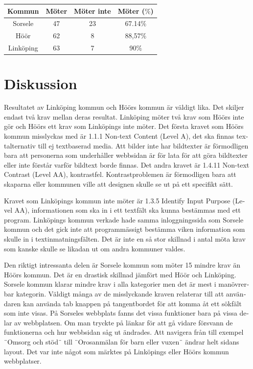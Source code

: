 \documentclass[11p]{article}
\begin{document}
\begin{otherlanguage}{swedish}
\begin{center}
    \begin{tabular}{ |c|c|c|c|}
        \hline
        Kommun & Möter & Möter inte & Möter ($\%$) \\  \hline
        Sorsele & 47 & 23 & 67.14$\%$ \\ \hline
        Höör & 62 & 8 & 88,57$\%$ \\ \hline
        Linköping & 63 & 7 & 90$\%$ \\ \hline
    \end{tabular}
    \end{center}

    \section{Diskussion} %
    Resultatet av Linköping kommun och Höörs kommun är väldigt lika.
    Det skiljer endast två krav mellan deras resultat.
    Linköping möter två krav som Höörs inte gör och Höörs ett krav som Linköpings inte möter.
    Det första kravet som  Höörs kommun misslyckas med är 1.1.1 Non-text Content (Level A), det ska finnas textalternativ till ej textbaserad media.
    Att bilder inte har bildtexter är förmodligen bara att personerna som underhåller webbsidan är för lata för att göra bildtexter eller inte förstår varför bildtext borde finnas.
    Det andra kravet är 1.4.11 Non-text Contrast (Level AA), kontrastfel.
    Kontrastproblemen är förmodligen bara att skaparna eller kommunen ville att designen skulle se ut på ett specifikt sätt.

    Kravet som Linköpings kommun inte möter är 1.3.5 Identify Input Purpose (Level AA), informationen som ska in i ett textfält ska kunna bestämmas med ett program.
    Linköpings kommun verkade hade samma inloggningssida som Sorsele kommun och det gick inte att programmässigt bestämma viken information som skulle in i textinmatningsfälten.
    Det är inte en så stor skillnad i antal möta krav som kanske skulle se likadan ut om andra kommuner valdes.

    Den riktigt intressanta delen är Sorsele kommun som möter 15 mindre krav än Höörs kommun.
    Det är en drastisk skillnad jämfört med Höör och Linköping.
    Sorsele kommun klarar mindre krav i alla kategorier men det är mest i manövrerbar kategorin.
    Väldigt många av de misslyckande kraven relaterar till att användaren kan använda tab knappen på tangentbordet för att komma åt ett sökfält som inte visas.
    På Sorseles webbplats fanns det vissa funktioner bara på vissa delar av webbplatsen.
    Om man tryckte på länkar för att gå vidare försvann de funktionerna och hur webbsidan såg ut ändrades.
    Att navigera från till exempel ¨Omsorg och stöd¨ till ¨Orosanmälan för barn eller vuxen¨ ändrar helt sidans layout.
    Det var inte något som märktes på Linköpings eller Höörs kommun webbplatser.


\end{otherlanguage}
\end{document}

